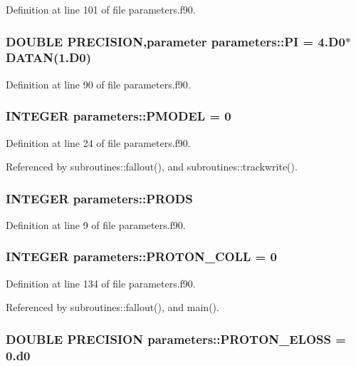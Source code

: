 Definition at line 101 of file parameters.f90.\hypertarget{namespaceparameters_afe0432626bebaa2d97468b2d263e28e7}{
\subsubsection[{PI}]{\setlength{\rightskip}{0pt plus 5cm}DOUBLE PRECISION,parameter {\bf parameters::PI} = 4.D0$\ast$DATAN(1.D0)}}
\label{namespaceparameters_afe0432626bebaa2d97468b2d263e28e7}


Definition at line 90 of file parameters.f90.\hypertarget{namespaceparameters_a38fbcf3f41331f232ff4c604194bc76f}{
\subsubsection[{PMODEL}]{\setlength{\rightskip}{0pt plus 5cm}INTEGER {\bf parameters::PMODEL} = 0}}
\label{namespaceparameters_a38fbcf3f41331f232ff4c604194bc76f}


Definition at line 24 of file parameters.f90.

Referenced by subroutines::fallout(), and subroutines::trackwrite().\hypertarget{namespaceparameters_a00c44079184906f8aff60ad7cea2fe4d}{
\subsubsection[{PRODS}]{\setlength{\rightskip}{0pt plus 5cm}INTEGER {\bf parameters::PRODS}}}
\label{namespaceparameters_a00c44079184906f8aff60ad7cea2fe4d}


Definition at line 9 of file parameters.f90.\hypertarget{namespaceparameters_a94b6e62dc83358943908a8418bd3e5ae}{
\subsubsection[{PROTON\_\-COLL}]{\setlength{\rightskip}{0pt plus 5cm}INTEGER {\bf parameters::PROTON\_\-COLL} = 0}}
\label{namespaceparameters_a94b6e62dc83358943908a8418bd3e5ae}


Definition at line 134 of file parameters.f90.

Referenced by subroutines::fallout(), and main().\hypertarget{namespaceparameters_a6cb40f66cca5617aa8331c5487829f10}{
\subsubsection[{PROTON\_\-ELOSS}]{\setlength{\rightskip}{0pt plus 5cm}DOUBLE PRECISION {\bf parameters::PROTON\_\-ELOSS} = 0.d0}}
\label{namespaceparameters_a6cb40f66cca5617aa8331c5487829f10}


